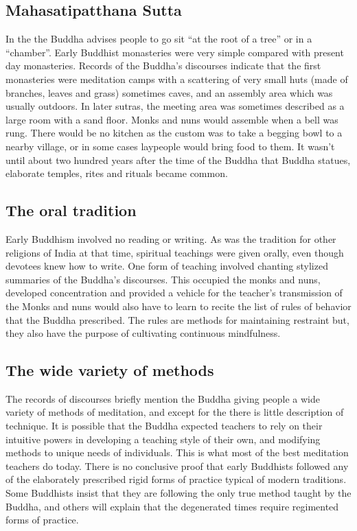 \documentclass[a5paper,10pt,english]{book}
\begin{document}
\subsection{Mahasatipatthana Sutta}
\label{\detokenize{saints:mahasatipatthana-sutta}}
\sphinxAtStartPar
In the  the Buddha advises people to go sit
“at the root of a tree” or in a “chamber”. Early Buddhist monasteries
were very simple compared with present day monasteries. Records of the
Buddha’s discourses indicate that the first monasteries were meditation
camps with a scattering of very small huts (made of branches, leaves and
grass) sometimes caves, and an assembly area which was usually outdoors.
In later sutras, the meeting area was sometimes described as a large
room with a sand floor. Monks and nuns would assemble when a bell was
rung. There would be no kitchen as the custom was to take a begging bowl
to a nearby village, or in some cases laypeople would bring food to
them. It wasn’t until about two hundred years after the time of the
Buddha that Buddha statues, elaborate temples, rites and rituals became
common.


\subsection{The oral tradition}
\label{\detokenize{saints:the-oral-tradition}}
\sphinxAtStartPar
Early Buddhism involved no reading or writing. As was the tradition for
other religions of India at that time, spiritual teachings were given
orally, even though devotees knew how to write. One form of teaching
involved chanting stylized summaries of the Buddha’s discourses. This
occupied the monks and nuns, developed concentration and provided a
vehicle for the teacher’s transmission of the  Monks and nuns
would also have to learn to recite the list of rules of behavior that
the Buddha prescribed. The rules are methods for maintaining restraint
but, they also have the purpose of cultivating continuous mindfulness.


\subsection{The wide variety of methods}
\label{\detokenize{saints:the-wide-variety-of-methods}}
\sphinxAtStartPar
The records of discourses briefly mention the Buddha giving people a
wide variety of methods of meditation, and except for the
 there is little description of technique. It
is possible that the Buddha expected teachers to rely on their intuitive
powers in developing a teaching style of their own, and modifying
methods to unique needs of individuals. This is what most of the best
meditation teachers do today. There is no conclusive proof that early
Buddhists followed any of the elaborately prescribed rigid forms of
practice typical of modern traditions. Some Buddhists insist that they
are following the only true method taught by the Buddha, and others will
explain that the degenerated times require regimented forms of practice.
\end{document}
